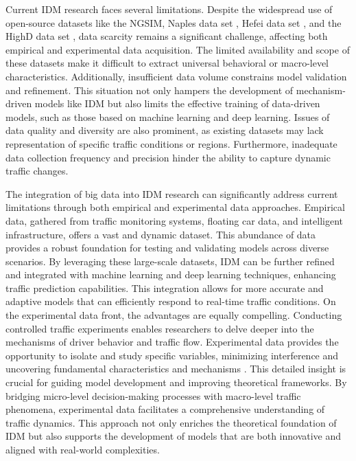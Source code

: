 \documentclass[a4paper,fleqn]{cas-sc}
\begin{document}
Current IDM research faces several limitations. Despite the widespread use of open-source datasets like the NGSIM, Naples data set \citep{punzoAnalysisComparisonMicroscopicTraffic2005}, Hefei data set \citep{jiangExperimentalFeaturesCarfollowingBehavior2015}, and the HighD data set \citep{krajewskiHighDDatasetDroneDataset2018}, data scarcity remains a significant challenge, affecting both empirical and experimental data acquisition. The limited availability and scope of these datasets make it difficult to extract universal behavioral or macro-level characteristics. Additionally, insufficient data volume constrains model validation and refinement. This situation not only hampers the development of mechanism-driven models like IDM but also limits the effective training of data-driven models, such as those based on machine learning and deep learning. Issues of data quality and diversity are also prominent, as existing datasets may lack representation of specific traffic conditions or regions. Furthermore, inadequate data collection frequency and precision hinder the ability to capture dynamic traffic changes.

The integration of big data into IDM research can significantly address current limitations through both empirical and experimental data approaches. Empirical data, gathered from traffic monitoring systems, floating car data, and intelligent infrastructure, offers a vast and dynamic dataset. This abundance of data provides a robust foundation for testing and validating models across diverse scenarios. By leveraging these large-scale datasets, IDM can be further refined and integrated with machine learning and deep learning techniques, enhancing traffic prediction capabilities. This integration allows for more accurate and adaptive models that can efficiently respond to real-time traffic conditions. On the experimental data front, the advantages are equally compelling. Conducting controlled traffic experiments enables researchers to delve deeper into the mechanisms of driver behavior and traffic flow. Experimental data provides the opportunity to isolate and study specific variables, minimizing interference and uncovering fundamental characteristics and mechanisms \citep{tianCarFollowingDynamicsExperiments2023}. This detailed insight is crucial for guiding model development and improving theoretical frameworks. By bridging micro-level decision-making processes with macro-level traffic phenomena, experimental data facilitates a comprehensive understanding of traffic dynamics. This approach not only enriches the theoretical foundation of IDM but also supports the development of models that are both innovative and aligned with real-world complexities.
\end{document}
